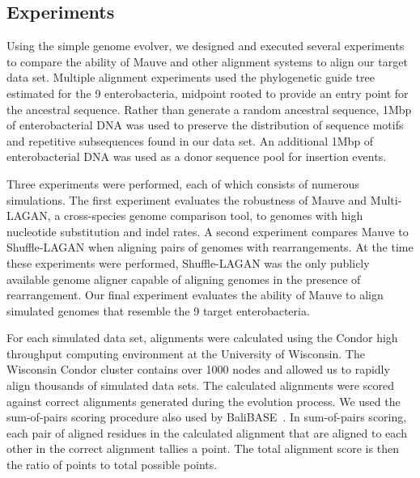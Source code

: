\documentclass[titlepage,11pt]{article}
\begin{document}

\subsection*{Experiments}
Using the simple genome evolver, we designed and executed several experiments
to compare the ability of Mauve and other alignment systems to align
our target data set.  Multiple alignment experiments used the phylogenetic guide tree
estimated for the 9 enterobacteria, midpoint rooted to provide an entry point
for the ancestral sequence.  Rather than generate a random ancestral sequence,
1Mbp of enterobacterial DNA was used to preserve the distribution of sequence
motifs and repetitive subsequences found in our data set.  An additional 1Mbp of
enterobacterial DNA was used as a donor sequence pool for insertion events.

Three experiments were performed, each of which consists of numerous
simulations.  The first experiment evaluates the robustness of Mauve and
Multi-LAGAN, a cross-species genome comparison tool, to genomes with high
nucleotide substitution and indel rates.  A second experiment compares Mauve to
Shuffle-LAGAN when aligning pairs of genomes with rearrangements.  At the time
these experiments were performed, Shuffle-LAGAN was the only publicly available
genome aligner capable of aligning genomes in the presence of rearrangement. 
Our final experiment evaluates the ability of Mauve to align simulated genomes 
that resemble the 9 target enterobacteria.

For each simulated data set, alignments were calculated using the Condor high
throughput computing environment at the University of Wisconsin.  The
Wisconsin Condor cluster contains over 1000 nodes and allowed us to rapidly align
thousands of simulated data sets.
The calculated alignments were scored against correct alignments generated
during the evolution process.  We used the sum-of-pairs scoring procedure also
used by BaliBASE~\citep{balibase}.  In sum-of-pairs scoring,
each pair of aligned residues in the calculated alignment that are aligned to
each other in the correct alignment tallies a point.  The total alignment score
is then the ratio of points to total possible points.
\end{document}
